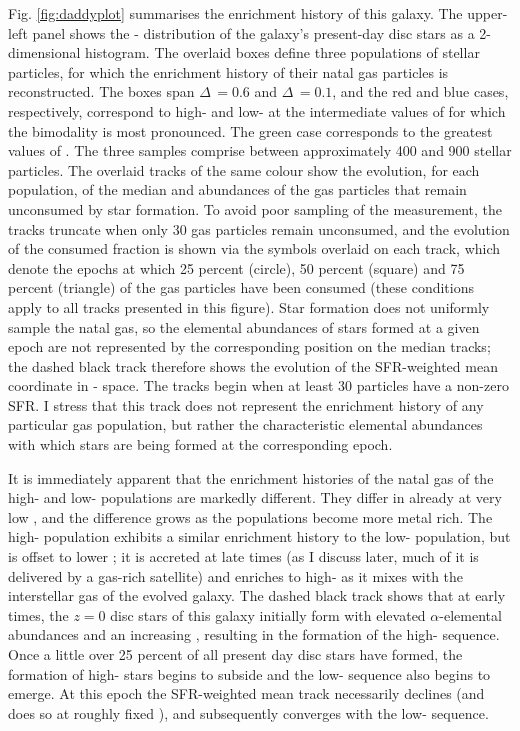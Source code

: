 Fig. \ref{fig:daddyplot} summarises the enrichment history of this galaxy. The upper-left panel shows the \afe{}-\feh{} distribution of the galaxy's present-day disc stars as a 2-dimensional histogram. The overlaid boxes define three populations of stellar particles, for which the enrichment history of their natal gas particles is reconstructed. The boxes span $\Delta$\feh{}\,$=0.6$ and $\Delta$\afe{}\,$=0.1$, and the red and blue cases, respectively, correspond to high-\afe{} and low-\afe{} at the intermediate values of \feh{} for which the bimodality is most pronounced. The green case corresponds to the greatest values of \feh{}. The three samples comprise between approximately 400 and 900 stellar particles. The overlaid tracks of the same colour show the evolution, for each population, of the median \afe{} and \feh{} abundances of the gas particles that remain unconsumed by star formation. To avoid poor sampling of the measurement, the tracks truncate when only 30 gas particles remain unconsumed, and the evolution of the consumed fraction is shown via the symbols overlaid on each track, which denote the epochs at which 25 percent (circle), 50 percent (square) and 75 percent (triangle) of the gas particles have been consumed (these conditions apply to all tracks presented in this figure). Star formation does not uniformly sample the natal gas, so the elemental abundances of stars formed at a given epoch are not represented by the corresponding position on the median tracks; the dashed black track therefore shows the evolution of the SFR-weighted mean coordinate in \afe{}-\feh{} space. The tracks begin when at least 30 particles have a non-zero SFR. I stress that this track does not represent the enrichment history of any particular gas population, but rather the characteristic elemental abundances with which stars are being formed at the corresponding epoch.

It is immediately apparent that the enrichment histories of the natal gas of the high- and low-\afe{} populations are markedly different. They differ in \afe{} already at very low \feh{}, and the difference grows as the populations become more metal rich. The high-\feh{} population exhibits a similar enrichment history to the low-\afe{} population, but is offset to lower \afe{}; it is accreted at late times (as I discuss later, much of it is delivered by a gas-rich satellite) and enriches to high-\feh{} as it mixes with the interstellar gas of the evolved galaxy. The dashed black track shows that at early times, the $z=0$ disc stars of this galaxy initially form with elevated $\alpha$-elemental abundances and an increasing \feh{}, resulting in the formation of the high-\afe{} sequence. Once a little over 25 percent of all present day disc stars have formed, the formation of high-\afe{} stars begins to subside and the low-\afe{} sequence also begins to emerge. At this epoch the SFR-weighted mean track necessarily declines (and does so at roughly fixed \feh{}), and subsequently converges with the low-\afe{} sequence.

